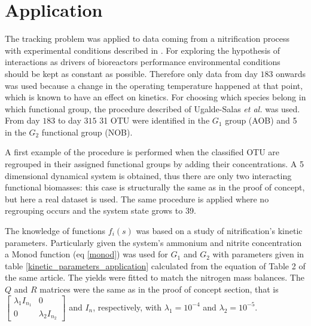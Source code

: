 \documentclass[3p,times]{article}
\begin{document}

\clearpage
\section{Application}
 

The tracking problem was applied to data coming from a nitrification process with experimental conditions described in \cite{dumont2008observers}. For exploring the hypothesis of interactions as drivers of bioreactors performance environmental conditions should be kept as constant as possible. Therefore only data from day $183$ onwards was used because a change in the operating temperature happened at that point, which is known to have an effect on kinetics. For choosing which species belong in which functional group, the procedure described of Ugalde-Salas \textit{et al.} \cite{Ugalde-Salas2019} was used. From day $183$ to day $315$ 31 OTU were identified in the $G_1$ group (AOB) and 5 in the $G_2$ functional group (NOB). 

A first example of the procedure is performed when the classified OTU are regrouped in their assigned functional groups by adding their concentrations. A 5 dimensional dynamical system is obtained, thus there are only two interacting functional biomasses: this case is structurally the same as in the proof of concept, but here a real dataset is used. The same procedure is applied where no regrouping occurs and the system state grows to 39. 

The knowledge of functions $f_i(s)$ was based on a study of nitrification's kinetic parameters\cite{Wiesmann1994}. Particularly given the system's ammonium and nitrite concentration a Monod function (eq \eqref{monod}) was used for $G_1$ and $G_2$ with parameters given in table \ref{kinetic_parameters_application} calculated from the equation of Table 2 of the same article. The yields were fitted to match the nitrogen mass balances. The $Q$ and $R$ matrices were the same as in the proof of concept section, that is $\begin{bmatrix}
\lambda_1 I_{n_1} &0  \\ 0& \lambda_2 I_{n_2}
\end{bmatrix}$ and $I_n$, respectively, with $\lambda_1 = 10^{-4}$ and $\lambda_2 = 10^{-5}$.
\end{document}
